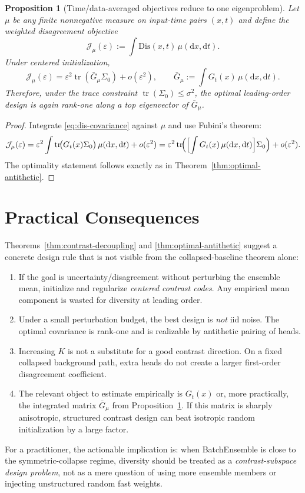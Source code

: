 \documentclass[11pt]{article}
\newcommand{\tr}{\operatorname{tr}}
\newtheorem{proposition}[theorem]{Proposition}
\theoremstyle{remark}
\begin{document}
\begin{proposition}[Time/data-averaged objectives reduce to one eigenproblem]
\label{prop:integrated-objective}
Let $\mu$ be any finite nonnegative measure on input-time pairs $(x,t)$ and define the weighted disagreement objective
\[
\mathcal J_\mu(\varepsilon)
:=
\int \mathrm{Dis}(x,t)\,\mu(\mathrm dx,\mathrm dt).
\]
Under centered initialization,
\[
\mathcal J_\mu(\varepsilon)
=
\varepsilon^2 \tr(\bar G_\mu \Sigma_0) + o(\varepsilon^2),
\qquad
\bar G_\mu := \int G_t(x)\,\mu(\mathrm dx,\mathrm dt).
\]
Therefore, under the trace constraint $\tr(\Sigma_0)\le \sigma^2$, the optimal leading-order design is again rank-one along a top eigenvector of $\bar G_\mu$.
\end{proposition}

\begin{proof}
Integrate \eqref{eq:dis-covariance} against $\mu$ and use Fubini's theorem:
\[
\mathcal J_\mu(\varepsilon)
=
\varepsilon^2 \int \tr\!\bigl(G_t(x)\Sigma_0\bigr)\,\mu(\mathrm dx,\mathrm dt) + o(\varepsilon^2)
=
\varepsilon^2 \tr\!\Bigl(\Bigl[\int G_t(x)\,\mu(\mathrm dx,\mathrm dt)\Bigr]\Sigma_0\Bigr) + o(\varepsilon^2).
\]
The optimality statement follows exactly as in Theorem~\ref{thm:optimal-antithetic}.
\end{proof}

\section{Practical Consequences}

Theorems~\ref{thm:contrast-decoupling} and \ref{thm:optimal-antithetic} suggest a concrete design rule that is not visible from the collapsed-baseline theorem alone:
\begin{enumerate}
\item If the goal is uncertainty/disagreement without perturbing the ensemble mean, initialize and regularize \emph{centered contrast codes}. Any empirical mean component is wasted for diversity at leading order.
\item Under a small perturbation budget, the best design is \emph{not} iid noise. The optimal covariance is rank-one and is realizable by antithetic pairing of heads.
\item Increasing $K$ is not a substitute for a good contrast direction. On a fixed collapsed background path, extra heads do not create a larger first-order disagreement coefficient.
\item The relevant object to estimate empirically is $G_t(x)$ or, more practically, the integrated matrix $\bar G_\mu$ from Proposition~\ref{prop:integrated-objective}. If this matrix is sharply anisotropic, structured contrast design can beat isotropic random initialization by a large factor.
\end{enumerate}

For a practitioner, the actionable implication is: when BatchEnsemble is close to the symmetric-collapse regime, diversity should be treated as a \emph{contrast-subspace design problem}, not as a mere question of using more ensemble members or injecting unstructured random fast weights.
\end{document}

